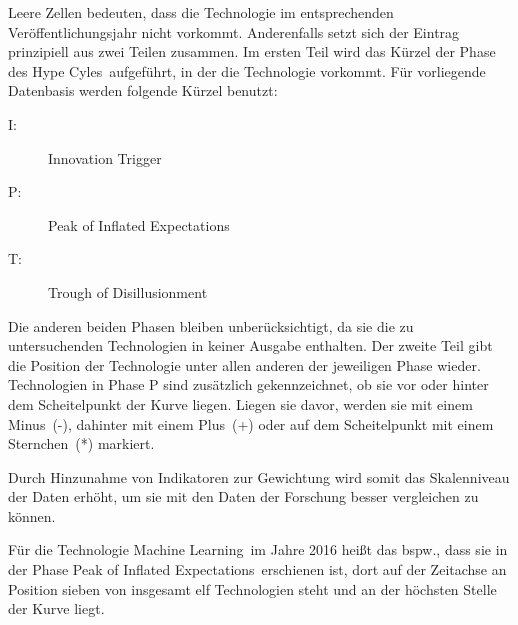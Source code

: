 Leere Zellen bedeuten, dass die Technologie im entsprechenden Veröffentlichungsjahr nicht vorkommt. Anderenfalls setzt sich der Eintrag prinzipiell aus zwei Teilen zusammen. Im ersten Teil wird das Kürzel der Phase des \glqq Hype Cyles\grqq~aufgeführt, in der die Technologie vorkommt. Für vorliegende Datenbasis werden folgende Kürzel benutzt:

\begin{description}
	\item[I:] Innovation Trigger
	\item[P:] Peak of Inflated Expectations
	\item[T:] Trough of Disillusionment
\end{description}

Die anderen beiden Phasen bleiben unberücksichtigt, da sie die zu untersuchenden Technologien in keiner Ausgabe enthalten. Der zweite Teil gibt die Position der Technologie unter allen anderen der jeweiligen Phase wieder. Technologien in Phase P sind zusätzlich gekennzeichnet, ob sie vor oder hinter dem Scheitelpunkt der Kurve liegen. Liegen sie davor, werden sie mit einem Minus~(-), dahinter mit einem Plus~(+) oder auf dem Scheitelpunkt mit einem Sternchen~(*) markiert.

Durch Hinzunahme von Indikatoren zur Gewichtung wird somit das Skalenniveau der Daten erhöht, um sie mit den Daten der Forschung besser vergleichen zu können.

Für die Technologie \glqq Machine Learning\grqq~im Jahre 2016 heißt das bspw., dass sie in der Phase \glqq Peak of Inflated Expectations\grqq~erschienen ist, dort auf der Zeitachse an Position sieben von insgesamt elf Technologien steht und an der höchsten Stelle der Kurve liegt.

